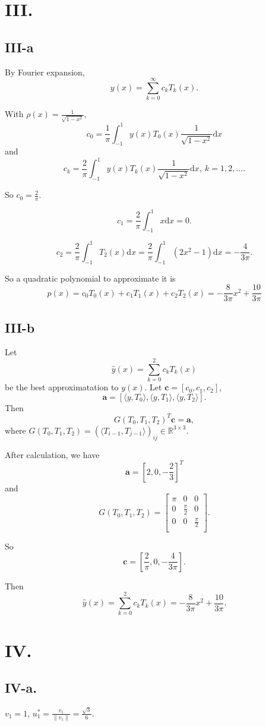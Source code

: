 \documentclass[a4paper]{article}
\begin{document}
\section*{III.}
\subsection*{III-a}
By Fourier expansion, 
$$
y(x)=\sum_{k=0}^\infty c_kT_k(x).
$$

With $\rho(x)=\frac{1}{\sqrt{1-x^2}}$, 
$$
c_0=\frac1\pi\int_{-1}^1y(x)T_0(x)\frac1{\sqrt{1-x^2}}\mathrm{d}x
$$
and
$$
c_k=\frac2\pi\int_{-1}^1y(x)T_k(x)\frac1{\sqrt{1-x^2}}\mathrm{d}x, \ k=1,2,\ldots.
$$

So $c_0=\frac2\pi$.

$$
c_1=\frac2\pi\int_{-1}^1x\mathrm{d}x=0.
$$

$$
c_2=\frac2\pi\int_{-1}^1T_2(x)\mathrm{d}x=\frac2\pi\int_{-1}^{1}(2x^2-1)\mathrm{d}x=-\frac{4}{3\pi}.
$$

So a quadratic polynomial to approximate it is
$$
p(x)=c_0T_0(x)+c_1T_1(x)+c_2T_2(x)=-\frac{8}{3\pi}x^2+\frac{10}{3\pi}
$$

\subsection*{III-b}
Let 
$$
\hat{y}(x)=\sum_{k=0}^2 c_kT_k(x)
$$
be the best approximatation to $y(x)$. Let $\mathbf{c}=[c_0,c_1,c_2]$, 
$$\mathbf{a}=[\langle y, T_0\rangle,\langle y, T_1\rangle,\langle y, T_2\rangle].$$
Then 
$$
G(T_0,T_1,T_2)^T \mathbf{c}=\mathbf{a},
$$
where $G(T_0,T_1,T_2)=(\langle T_{i-1}, T_{j-1}\rangle)_{ij}\in \mathbb{R}^{3\times 3}$.

After calculation, we have
$$
\mathbf{a}=[2,0,-\frac{2}{3}]^T
$$
and 
$$
G(T_0,T_1,T_2)=\begin{bmatrix}
    \pi & 0 & 0\\
    0& \frac{\pi}{2} & 0 \\
    0 & 0 & \frac{\pi}{2} \\
\end{bmatrix}.
$$

So 
$$
\mathbf{c}=[\frac{2}{\pi}, 0, -\frac{4}{3\pi}].
$$

Then
$$
\hat{y}(x)=\sum_{k=0}^2 c_kT_k(x)=-\frac{8}{3\pi}x^2+\frac{10}{3\pi}.
$$

\section*{IV.}
\subsection*{IV-a.}
$v_1=1$, $u_1^*=\frac{v_1}{\| v_1\|}=\frac{\sqrt{3}}{6}$.
\end{document}
